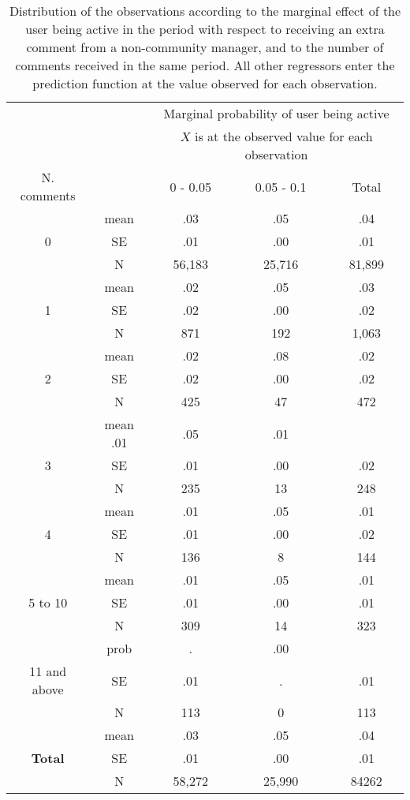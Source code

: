 \begin{table}[htbp]\centering
	\begin{tabular}{c c | c  c | c}
 		& & \multicolumn{3}{c}{Marginal probability of user being active} \\
		& & \multicolumn{3}{c}{$X$ is at the observed value for each observation} \\
		\hline
		N. comments& & 0 - 0.05&0.05 - 0.1&Total \\
		\hline
		& mean & .03 & .05 & .04 \\ 
		0 & SE & .01 & .00 & .01 \\
		& N & 56,183&25,716&81,899 \\
		\hline
		 & mean & .02 & .05 & .03 \\
		1 & SE & .02 & .00 & .02 \\
		&N&871 & 192 & 1,063 \\
		\hline
		& mean & .02 & .08 & .02 \\
		2 & SE & .02 & .00 &.02 \\
		& N& 425 & 47 & 472 \\
		\hline
		& mean .01 & .05 & .01 \\
		3 & SE & .01 & .00 & .02 \\
		&N& 235 & 13 & 248\\
		\hline
		& mean & .01 & .05 & .01 \\
		4 & SE & .01 & .00 & .02 \\
		& N & 136 & 8 & 144 \\
		\hline
		& mean & .01 & .05 & .01  \\
		5 to 10 & SE & .01 & .00 & .01 \\
		& N&309&14& 323 \\
		\hline
		& prob & . & .00 \\
		11 and above & SE & .01 & . & .01\\
		& N &113 & 0 & 113\\
		\hline
		& mean & .03 & .05 & .04 \\
		\textbf{Total} & SE & .01 & .00 & .01\\
		& N & 58,272 & 25,990 & 84262 \\
		\hline
	\end{tabular}
	\caption{Distribution of the observations according to the marginal effect of the user being active in the period with respect to receiving an extra comment from a non-community manager, and to the number of comments received in the same period. All other regressors enter the prediction function at the value observed for each observation.}
	\label{tab:marginalProbabilityXurecObserved}
\end{table}

